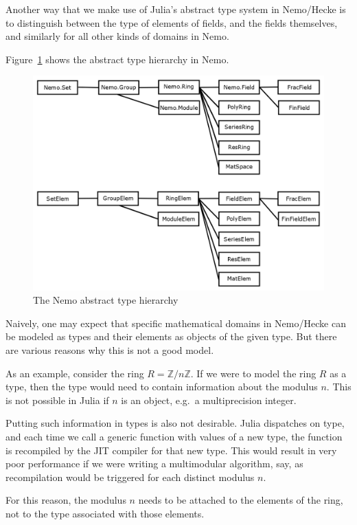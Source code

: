 \documentclass{sig-alternate-05-2015}
\begin{document}
Another way that we make use of Julia's abstract type system in Nemo/Hecke is to distinguish
between the type of elements of fields, and the fields themselves, and similarly for all other
kinds of domains in Nemo. 

Figure~\ref{fig:types} shows the abstract type hierarchy in Nemo.

\begin{figure}[h]
\centering
\includegraphics[scale=0.19]{types.png}
\caption{The Nemo abstract type hierarchy}
\label{fig:types}
\end{figure}

Naively, one may expect that specific mathematical domains in Nemo/Hecke can be modeled as types
and their elements as objects of the given type. But there are various reasons why this is not a
good model.

As an example, consider the ring $R = \mathbb{Z}/n\mathbb{Z}$. If we were to model the ring $R$
as a type, then the type would need to contain information about the modulus $n$. This is not
possible in Julia if $n$ is an object, e.g.\ a multiprecision integer.

Putting such information in types is also not desirable. Julia dispatches on type, and each time
we call a generic function with values of a new type, the function is recompiled by the
JIT compiler for that new type. This would result in very poor performance if we were writing a
multimodular algorithm, say, as recompilation would be triggered for each distinct modulus $n$.

For this reason, the modulus $n$ needs to be attached to the elements of the ring, not to the type
associated with those elements.
\end{document}

